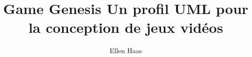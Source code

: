 \documentclass[12pt,twoside]{memoireuqam1.3}
\begin{document}
\title{Game Genesis \hspace{20cm} Un profil UML pour la conception de jeux vidéos}
\author{Ellen Haas}
\uqammemoire %
{}
\thispagestyle{empty}        %
\maketitle



\renewcommand \bibname{R\'EF\'ERENCES}%
\renewcommand \listfigurename{LISTE DES FIGURES}
\renewcommand \appendixname{APPENDICE}
\renewcommand \figurename{Figure}
\renewcommand \tablename{Tableau}

\addtocounter{page}{1} %
%
%
%

\tableofcontents %
\listoffigures %
\listoftables %




















\end{document}
